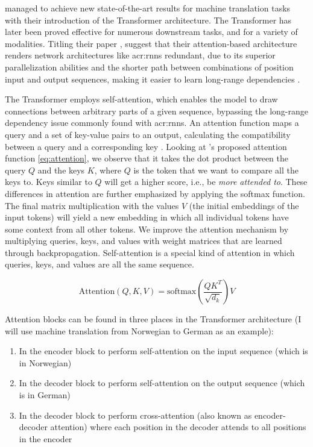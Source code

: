 \cite{vaswaniAttentionAllYou2017} managed to achieve new state-of-the-art results for machine translation tasks with their introduction of the Transformer architecture. The Transformer has later been proved effective for numerous downstream tasks, and for a variety of modalities. Titling their paper , \citeauthor{vaswaniAttentionAllYou2017} suggest that their attention-based architecture renders network architectures like \glspl{acr:rnn} redundant, due to its superior parallelization abilities and the shorter path between combinations of position input and output sequences, making it easier to learn long-range dependencies \citep[6]{vaswaniAttentionAllYou2017}.

The Transformer employs self-attention, which enables the model to draw connections between arbitrary parts of a given sequence, bypassing the long-range dependency issue commonly found with \glspl{acr:rnn}. An attention function maps a query and a set of key-value pairs to an output, calculating the compatibility between a query and a corresponding key \citep[3]{vaswaniAttentionAllYou2017}. Looking at \citeauthor{vaswaniAttentionAllYou2017}'s proposed attention function \eqref{eq:attention}, we observe that it takes the dot product between the query $Q$ and the keys $K$, where $Q$ is the token that we want to compare all the keys to. Keys similar to $Q$ will get a higher score, i.e., be \textit{more attended to}. These differences in attention are further emphasized by applying the softmax function. The final matrix multiplication with the values $V$ (the initial embeddings of the input tokens) will yield a new embedding in which all individual tokens have some context from all other tokens. We improve the attention mechanism by multiplying queries, keys, and values with weight matrices that are learned through backpropagation. Self-attention is a special kind of attention in which queries, keys, and values are all the same sequence.


\begin{equation}
    \text{Attention}(Q, K, V) = \text{softmax}\left(\frac{QK^T}{\sqrt{d_k}}\right)V
    \label{eq:attention}
\end{equation}

Attention blocks can be found in three places in the Transformer architecture \citep[5]{vaswaniAttentionAllYou2017} (I will use machine translation from Norwegian to German as an example):

\begin{enumerate}
    \item In the encoder block to perform self-attention on the input sequence (which is in Norwegian)
    \item In the decoder block to perform self-attention on the output sequence (which is in German)
    \item In the decoder block to perform cross-attention (also known as encoder-decoder attention) where each position in the decoder attends to all positions in the encoder
\end{enumerate}

